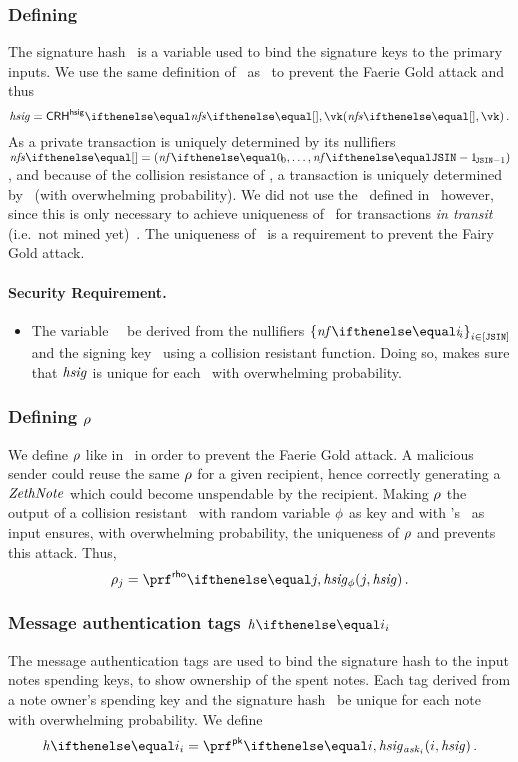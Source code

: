 \subsubsection{Defining \hsig}\label{zeth-protocol:sec-req:add-notes:def-hsig}

The signature hash \hsig~is a variable used to bind the signature keys to the primary inputs.
We use the same definition of \hsig~as \zcash~to prevent the Faerie Gold attack and thus
\[
   \hsig = \crhhsig{\nfs{}, \vk}\,.
\]
 As a private transaction is uniquely determined by its nullifiers $\nfs{} = \smalltuple{\nf{0}, \ldots, \nf{\jsin - 1}}$, and because of the collision resistance of \crhhsig{}, a transaction is uniquely determined by \hsig~(with overwhelming probability). We did not use the \randomSeed~defined in \zcash~however, since this is only necessary to achieve uniqueness of \hsig~for transactions \emph{in transit} (i.e.~not mined yet)~\cite{zcash-randomseed-hsig}.
The uniqueness of \hsig~is a requirement to prevent the Fairy Gold attack.

\paragraph{Security Requirement.}
\begin{itemize}
    \item The variable \hsig~\MUST~be derived from the nullifiers $\indexedset{\nf{i}}{i \in [\jsin]}$ and the signing key \vk~using a collision resistant function. Doing so, makes sure that $\mathit{hsig}$ is unique for each \zethTx~with overwhelming probability.
\end{itemize}

\subsubsection{Defining $\mathit{\rho}$}\label{zeth-protocol:sec-req:add-notes:def-rho}

We define $\mathit{\rho}$ like in \zcash~in order to prevent the Faerie Gold attack. A malicious sender could reuse the same $\mathit{\rho}$ for a given recipient, hence correctly generating a $\mathit{ZethNote}$ which could become unspendable by the recipient. Making $\mathit{\rho}$ the output of a collision resistant \prf~with random variable $\mathit{\phi}$ as key and with \zethTx's \hsig~as input ensures, with overwhelming probability, the uniqueness of $\mathit{\rho}$ and prevents this attack. Thus,
\[
    \rrho_{j} = \prfrho{\pphi}{j, \hsig}\,.
\]

\subsubsection{Message authentication tags $\htag{i}$}\label{zeth-protocol:sec-req:add-notes:def-htag}

The message authentication tags are used to bind the signature hash to the input notes spending keys, to show ownership of the spent notes. Each tag derived from a note owner's spending key and the signature hash \MUST~be unique for each note with overwhelming probability. We define
\[
    \htag{i} = \prfpk{\ask_{i}}{i, \hsig}\,.
\]
